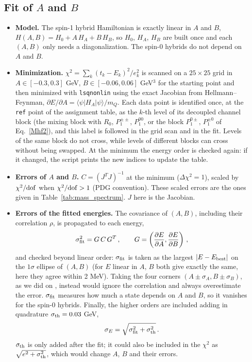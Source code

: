 \documentclass[11pt, a4paper]{article}
\begin{document}
\subsection{Fit of $A$ and $B$}
\label{sec:fit}
\begin{itemize}
    \item \textbf{Model.} The spin-1 hybrid Hamiltonian is exactly linear in $A$ and $B$, $H(A,B)=H_0+A\,H_A+B\,H_B$, so $H_0$, $H_A$, $H_B$ are built once and each $(A,B)$ only needs a diagonalization. The spin-0 hybrids do not depend on $A$ and $B$.
    \item \textbf{Minimization.} $\chi^2=\sum_k (t_k-E_k)^2/e_k^2$ is scanned on a $25\times25$ grid in $A\in[-0.3,0.3]$ GeV, $B\in[-0.06,0.06]$ GeV$^3$ for the starting point and then minimized with \texttt{lsqnonlin} using the exact Jacobian from Hellmann--Feynman, $\partial E/\partial A=\langle\psi|H_A|\psi\rangle/m_Q$. Each data point is identified once, at the \texttt{ref} point of the assignment table, as the $k$-th level of its decoupled channel block (the mixing block with $R_0$, $P_1^{\pm\pm}$, $P_1^{00}$, or the block $P_1^{0\pm}$, $P_1^{\pm0}$ of Eq.~\eqref{Mhf2}), and this label is followed in the grid scan and in the fit. Levels of the same block do not cross, while levels of different blocks can cross without being swapped. At the minimum the energy order is checked again: if it changed, the script prints the new indices to update the table.
    \item \textbf{Errors of $A$ and $B$.} $C=(J^TJ)^{-1}$ at the minimum ($\Delta\chi^2=1$), scaled by $\chi^2/{\rm dof}$ when $\chi^2/{\rm dof}>1$ (PDG convention). These scaled errors are the ones given in Table~\ref{tab:mass_spectrum}. $J$ here is the Jacobian.
    \item \textbf{Errors of the fitted energies.} The covariance of $(A,B)$, including their correlation $\rho$, is propagated to each energy,
    \begin{equation}
        \sigma_{\rm fit}^2 = G\,C\,G^T \, , \qquad G=\left(\frac{\partial E}{\partial A},\frac{\partial E}{\partial B}\right) \, ,
    \end{equation}
    and checked beyond linear order: $\sigma_{\rm fit}$ is taken as the largest $|E-E_{\rm best}|$ on the $1\sigma$ ellipse of $(A,B)$ (for $E$ linear in $A$, $B$ both give exactly the same, here they agree within 2 MeV). Taking the four corners $(A\pm\sigma_A, B\pm\sigma_B)$, as we did on \cite{Soto:2023lbh}, instead would ignore the correlation and always overestimate the error. $\sigma_{\rm fit}$ measures how much a state depends on $A$ and $B$, so it vanishes for the spin-0 hybrids. Finally, the higher orders are included adding in quadrature $\sigma_{\rm th}=0.03$ GeV,
    \begin{equation}
        \sigma_E=\sqrt{\sigma_{\rm fit}^2+\sigma_{\rm th}^2} \, .
    \end{equation}
    {\color{blue} $\sigma_{\rm th}$ is only added after the fit; it could also be included in the $\chi^2$ as $\sqrt{e^2+\sigma_{\rm th}^2}$, which would change $A$, $B$ and their errors.}
\end{itemize}
\end{document}
